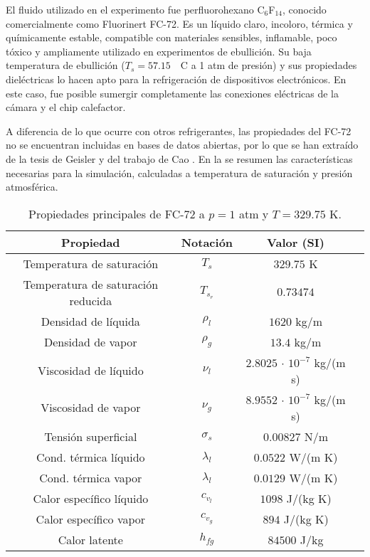 El fluido utilizado en el experimento fue perfluorohexano C$_6$F$_{14}$, conocido comercialmente como Fluorinert FC-72. Es un l\'iquido claro, incoloro, t\'ermica y qu\'imicamente estable, compatible con materiales sensibles, inflamable, poco t\'oxico y ampliamente utilizado en experimentos de ebullici\'on. Su baja temperatura de ebullici\'on ($T_{s}=57.15$~\textordmasculine~C a 1 atm de presi\'on) y sus propiedades diel\'ectricas lo hacen apto para la refrigeraci\'on de dispositivos electr\'onicos. En este caso, fue posible sumergir completamente las conexiones el\'ectricas de la c\'amara y el chip calefactor.

A diferencia de lo que ocurre con otros refrigerantes, las propiedades del FC-72 no se encuentran incluidas en bases de datos abiertas, por lo que se han extra\'ido de la tesis de Geisler \cite{larson_geisler_buoyancy-driven_2007} y del trabajo de Cao \cite{cao_experimental_2019}. En la  se resumen las caracter\'isticas necesarias para la simulaci\'on, calculadas a temperatura de saturaci\'on y presi\'on atmosf\'erica.

\begin{table}[ht]
	\centering
    \begin{tabular}{c c c c}
	    \toprule
        \bf Propiedad & \bf Notaci\'on & \bf Valor (SI)\\
        \midrule
		Temperatura de saturaci\'on & $T_s$ & $329.75$ K \\
		Temperatura de saturaci\'on reducida & $T_{s_r}$ & $0.73474$ \\
		Densidad de l\'iquida & $\rho_l$ & $1620$ kg/m\sps{3} \\
		Densidad de vapor & $\rho_g$ & $13.4$ kg/m\sps{3} \\		
		Viscosidad de l\'iquido & $\nu_l$ & $2.8025 \, \cdot\,10^{-7}$ kg/(m s) \\		
		Viscosidad de vapor & $\nu_g$ & $8.9552 \, \cdot\,10^{-7}$ kg/(m s) \\
		Tensi\'on superficial & $\sigma_s$ & $0.00827$ N/m \\
		Cond. t\'ermica l\'iquido & $\lambda_l$ & $0.0522$ W/(m K) \\
		Cond. t\'ermica vapor & $\lambda_l$ & $0.0129$ W/(m K) \\
		Calor espec\'ifico l\'iquido & $c_{v_l}$ & $1098$ J/(kg K) \\
		Calor espec\'ifico vapor & $c_{v_g}$ & $894$ J/(kg K) \\
		Calor latente & $h_{fg}$ & $84500$ J/kg \\
        \bottomrule
	\end{tabular}
	\caption{Propiedades principales de FC-72 a $p=1$ atm y $T=329.75$ K.}
	\label{tab:fc72_prop}
\end{table} 
\FloatBarrier

